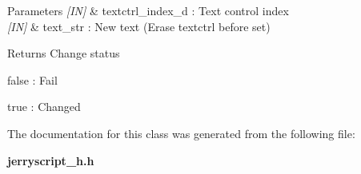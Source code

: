 \begin{DoxyParams}{Parameters}
{\em \mbox{[}\+I\+N\mbox{]}} & textctrl\+\_\+index\+\_\+d \+: Text control index \\
\hline
{\em \mbox{[}\+I\+N\mbox{]}} & text\+\_\+str \+: New text (Erase textctrl before set) \\
\hline
\end{DoxyParams}
\begin{DoxyReturn}{Returns}
Change status \begin{DoxyItemize}
\item false \+: Fail \item true \+: Changed \end{DoxyItemize}

\end{DoxyReturn}


The documentation for this class was generated from the following file\+:\begin{DoxyCompactItemize}
\item 
\textbf{ jerryscript\+\_\+h.\+h}\end{DoxyCompactItemize}
